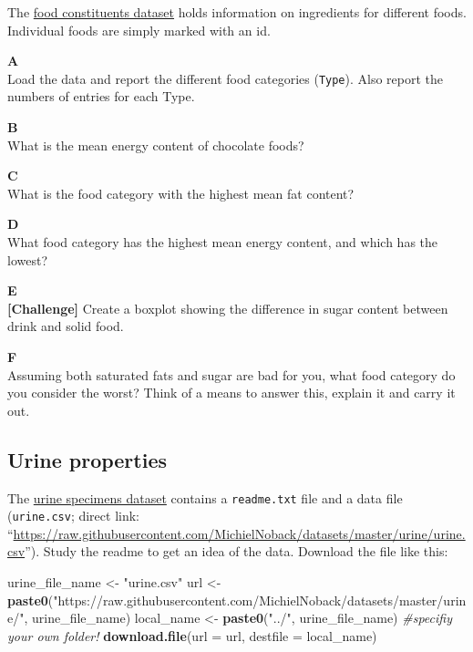 \documentclass[]{book}
\newenvironment{Shaded}{\begin{snugshade}}{\end{snugshade}}
\newcommand{\CommentTok}[1]{\textcolor[rgb]{0.56,0.35,0.01}{\textit{#1}}}
\newcommand{\DataTypeTok}[1]{\textcolor[rgb]{0.13,0.29,0.53}{#1}}
\newcommand{\KeywordTok}[1]{\textcolor[rgb]{0.13,0.29,0.53}{\textbf{#1}}}
\newcommand{\NormalTok}[1]{#1}
\newcommand{\StringTok}[1]{\textcolor[rgb]{0.31,0.60,0.02}{#1}}
\begin{document}
The \href{https://raw.githubusercontent.com/MichielNoback/davur1_gitbook/master/data/food_constituents.txt}{food constituents dataset} holds information on ingredients for different foods. Individual foods are simply marked with an id.

\textbf{A}\\
Load the data and report the different food categories (\texttt{Type}). Also report the numbers of entries for each Type.

\textbf{B}\\
What is the mean energy content of chocolate foods?

\textbf{C}\\
What is the food category with the highest mean fat content?

\textbf{D}\\
What food category has the highest mean energy content, and which has the lowest?

\textbf{E}\\
\textbf{{[}Challenge{]}} Create a boxplot showing the difference in sugar content between drink and solid food.

\textbf{F}\\
Assuming both saturated fats and sugar are bad for you, what food category do you consider the worst? Think of a means to answer this, explain it and carry it out.

\hypertarget{urine-properties}{%
\subsection{Urine properties}\label{urine-properties}}

The \href{https://github.com/MichielNoback/datasets/tree/master/urine}{urine specimens dataset} contains a \texttt{readme.txt} file and a data file (\texttt{urine.csv}; direct link: ``\url{https://raw.githubusercontent.com/MichielNoback/datasets/master/urine/urine.csv}''). Study the readme to get an idea of the data. Download the file like this:

\begin{Shaded}
\begin{Highlighting}[]
\NormalTok{urine_file_name <-}\StringTok{ "urine.csv"}
\NormalTok{url <-}\StringTok{ }\KeywordTok{paste0}\NormalTok{(}\StringTok{"https://raw.githubusercontent.com/MichielNoback/datasets/master/urine/"}\NormalTok{, urine_file_name)}
\NormalTok{local_name <-}\StringTok{ }\KeywordTok{paste0}\NormalTok{(}\StringTok{"../"}\NormalTok{, urine_file_name) }\CommentTok{#specifiy your own folder!}
\KeywordTok{download.file}\NormalTok{(}\DataTypeTok{url =}\NormalTok{ url, }\DataTypeTok{destfile =}\NormalTok{ local_name)}
\end{Highlighting}
\end{Shaded}
\end{document}

